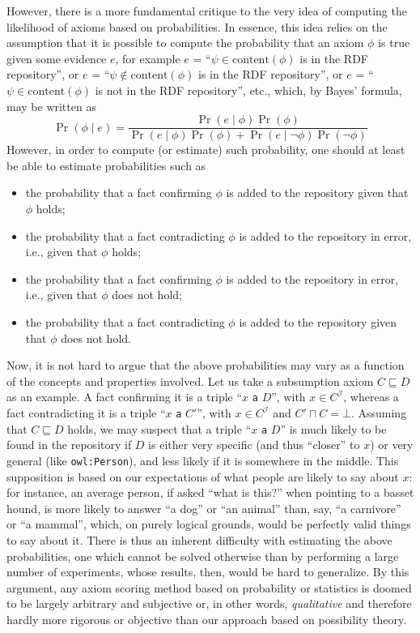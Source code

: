 \documentclass[a4paper]{article}
\newcounter{ex}
\begin{document}
However, there is a more fundamental critique to the very idea of computing the likelihood
of axioms based on probabilities. In essence, this idea relies on the assumption
that it is possible to compute the probability that an axiom $\phi$ is true given
some evidence $e$, for example $e$ = ``$\psi \in \mathrm{content}(\phi)$ is in the RDF repository'',
or $e$ = ``$\psi \notin \mathrm{content}(\phi)$ is in the RDF repository'',
or $e$ = ``$\psi \in \mathrm{content}(\phi)$ is not in the RDF repository'', etc.,
which, by Bayes' formula, may be written as
\begin{equation}
  \Pr(\phi \mid e) =
    \frac{\Pr(e \mid \phi)\Pr(\phi)}{\Pr(e \mid \phi)\Pr(\phi) + \Pr(e \mid \neg\phi)\Pr(\neg\phi)}
\end{equation}
However, in order to compute (or estimate) such probability,
one should at least be able to estimate probabilities such as
\begin{itemize}
\item the probability that a fact confirming $\phi$ is added to the repository
  given that $\phi$ holds;
\item the probability that a fact contradicting $\phi$ is added to the repository
  in error, i.e., given that $\phi$ holds;
\item the probability that a fact confirming $\phi$ is added to the repository
  in error, i.e., given that $\phi$ does not hold;
\item the probability that a fact contradicting $\phi$ is added to the repository
  given that $\phi$ does not hold.
\end{itemize}
Now, it is not hard to argue that the above probabilities may vary as a function of the
concepts and properties involved. Let us take a subsumption axiom $C \sqsubseteq D$
as an example. A fact confirming it is a triple ``$x$ \texttt{a} $D$'', with $x\in C^\mathcal{I}$,
whereas a fact contradicting it is a triple ``$x$ \texttt{a} $C'$'', with $x\in C^\mathcal{I}$
and $C' \sqcap C = \bot$. Assuming that $C \sqsubseteq D$ holds, we may suspect that
a triple ``$x$ \texttt{a} $D$'' is much likely to be found in the repository
if $D$ is either very specific (and thus ``closer'' to $x$) or very general (like
\texttt{owl:Person}), and less likely if it is somewhere in the middle.
This supposition is based on our expectations of what people are likely to say
about $x$: for instance, an average person, if asked ``what is this?'' when pointing
to a basset hound, is more likely to answer ``a dog'' or ``an animal'' than,
say, ``a carnivore'' or ``a mammal'', which, on purely logical grounds,
would be perfectly valid things to say about it.
There is thus an inherent difficulty with estimating the above probabilities,
one which cannot be solved otherwise than by performing a large number of
experiments, whose results, then, would be hard to generalize.
By this argument, any axiom scoring method based on probability or statistics is doomed
to be largely arbitrary and subjective or, in other words, \emph{qualitative}
and therefore hardly more rigorous or objective than our approach based on possibility theory.
\end{document}
